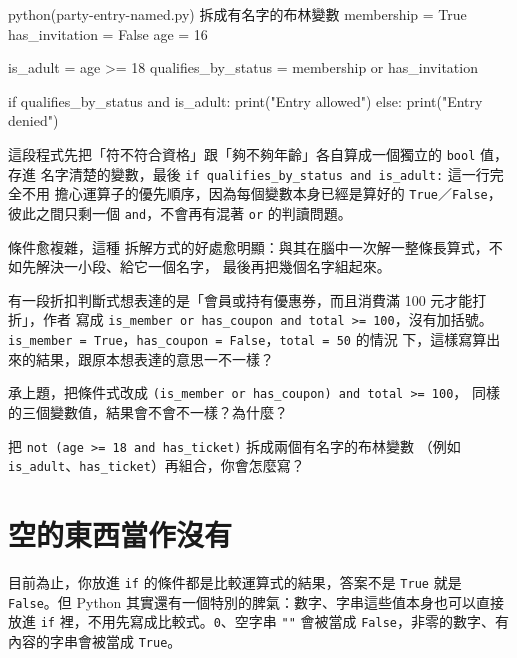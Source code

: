 \begin{example}{python}{(party-entry-named.py) 拆成有名字的布林變數}
membership = True
has_invitation = False
age = 16

is_adult = age >= 18
qualifies_by_status = membership or has_invitation

if qualifies_by_status and is_adult:
    print("Entry allowed")
else:
    print("Entry denied")
\end{example}


這段程式先把「符不符合資格」跟「夠不夠年齡」各自算成一個獨立的 \texttt{bool} 值，存進
名字清楚的變數，最後 \texttt{if qualifies\_by\_status and is\_adult:} 這一行完全不用
擔心運算子的優先順序，因為每個變數本身已經是算好的 \texttt{True}／\texttt{False}，
彼此之間只剩一個 \texttt{and}，不會再有混著 \texttt{or} 的判讀問題。

條件愈複雜，這種
拆解方式的好處愈明顯：與其在腦中一次解一整條長算式，不如先解決一小段、給它一個名字，
最後再把幾個名字組起來。

\begin{drills}[label=drills:readable-conditions]
\item 有一段折扣判斷式想表達的是「會員或持有優惠券，而且消費滿 100 元才能打折」，作者
寫成 \texttt{is\_member or has\_coupon and total >= 100}，沒有加括號。
\texttt{is\_member = True}，\texttt{has\_coupon = False}，\texttt{total = 50} 的情況
下，這樣寫算出來的結果，跟原本想表達的意思一不一樣？
\item 承上題，把條件式改成 \texttt{(is\_member or has\_coupon) and total >= 100}，
同樣的三個變數值，結果會不會不一樣？為什麼？
\item 把 \texttt{not (age >= 18 and has\_ticket)} 拆成兩個有名字的布林變數
（例如 \texttt{is\_adult}、\texttt{has\_ticket}）再組合，你會怎麼寫？
\end{drills}

\section{空的東西當作沒有}
\label{sec:truthy-falsy}

目前為止，你放進 \texttt{if} 的條件都是比較運算式的結果，答案不是 \texttt{True} 就是
\texttt{False}。但 Python 其實還有一個特別的脾氣：數字、字串這些值本身也可以直接放進
\texttt{if} 裡，不用先寫成比較式。\texttt{0}、空字串 \texttt{""} 會被當成
\texttt{False}，非零的數字、有內容的字串會被當成 \texttt{True}。

